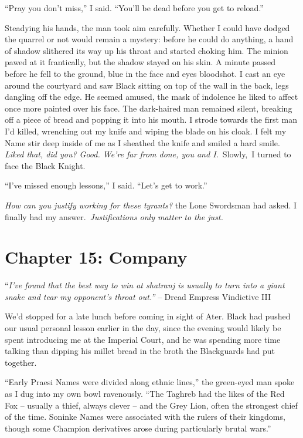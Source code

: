 \documentclass[12pt, openany]{book}
\begin{document}
“Pray you don’t miss,” I said. “You’ll be dead before you get to reload.”

Steadying his hands, the man took aim carefully. Whether I could have dodged the quarrel or not would remain a mystery: before he could do anything, a hand of shadow slithered its way up his throat and started choking him. The minion pawed at it frantically, but the shadow stayed on his skin. A minute passed before he fell to the ground, blue in the face and eyes bloodshot. I cast an eye around the courtyard and saw Black sitting on top of the wall in the back, legs dangling off the edge. He seemed amused, the mask of indolence he liked to affect once more painted over his face. The dark-haired man remained silent, breaking off a piece of bread and popping it into his mouth. I strode towards the first man I’d killed, wrenching out my knife and wiping the blade on his cloak. I felt my Name stir deep inside of me as I sheathed the knife and smiled a hard smile.\textit{ Liked that, did you? Good. We’re far from done, you and I.} Slowly, I turned to face the Black Knight.

“I’ve missed enough lessons,” I said. “Let’s get to work.”

\textit{How can you justify working for these tyrants?} the Lone Swordsman had asked. I finally had my answer. \textit{Justifications only matter to the just.}
\clearpage
\chapter{Chapter 15: Company}

“\textit{I’ve found that the best way to win at shatranj is usually to turn into a giant snake and tear my opponent’s throat out.”}
– Dread Empress Vindictive III

We’d stopped for a late lunch before coming in sight of Ater. Black had pushed our usual personal lesson earlier in the day, since the evening would likely be spent introducing me at the Imperial Court, and he was spending more time talking than dipping his millet bread in the broth the Blackguards had put together.

“Early Praesi Names were divided along ethnic lines,” the green-eyed man spoke as I dug into my own bowl ravenously. “The Taghreb had the likes of the Red Fox – usually a thief, always clever – and the Grey Lion, often the strongest chief of the time. Soninke Names were associated with the rulers of their kingdoms, though some Champion derivatives arose during particularly brutal wars.”
\end{document}
